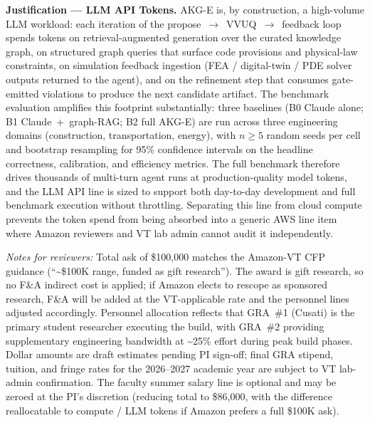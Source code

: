 \documentclass[10pt]{article}
\begin{document}
\vspace{1em}

\noindent\textbf{Justification --- LLM API Tokens.}
AKG-E is, by construction, a high-volume LLM workload: each iteration of the propose~$\to$~VVUQ~$\to$~feedback loop spends tokens on retrieval-augmented generation over the curated knowledge graph, on structured graph queries that surface code provisions and physical-law constraints, on simulation feedback ingestion (FEA / digital-twin / PDE solver outputs returned to the agent), and on the refinement step that consumes gate-emitted violations to produce the next candidate artifact. The benchmark evaluation amplifies this footprint substantially: three baselines (B0 Claude alone; B1 Claude~+~graph-RAG; B2 full AKG-E) are run across three engineering domains (construction, transportation, energy), with $n\geq5$ random seeds per cell and bootstrap resampling for 95\% confidence intervals on the headline correctness, calibration, and efficiency metrics. The full benchmark therefore drives thousands of multi-turn agent runs at production-quality model tokens, and the LLM API line is sized to support both day-to-day development and full benchmark execution without throttling. Separating this line from cloud compute prevents the token spend from being absorbed into a generic AWS line item where Amazon reviewers and VT lab admin cannot audit it independently.

\vspace{0.6em}

\noindent\textit{Notes for reviewers:} Total ask of \$100{,}000 matches the Amazon-VT CFP guidance (``\textasciitilde\$100K range, funded as gift research''). The award is gift research, so no F\&A indirect cost is applied; if Amazon elects to rescope as sponsored research, F\&A will be added at the VT-applicable rate and the personnel lines adjusted accordingly. Personnel allocation reflects that GRA~\#1 (Cusati) is the primary student researcher executing the build, with GRA~\#2 providing supplementary engineering bandwidth at \textasciitilde 25\% effort during peak build phases. Dollar amounts are draft estimates pending PI sign-off; final GRA stipend, tuition, and fringe rates for the 2026--2027 academic year are subject to VT lab-admin confirmation. The faculty summer salary line is optional and may be zeroed at the PI's discretion (reducing total to \$86{,}000, with the difference reallocatable to compute / LLM tokens if Amazon prefers a full \$100K ask).
\end{document}

